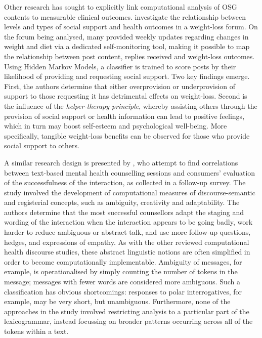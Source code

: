 Other research has sought to explicitly link computational analysis of \gls{OSG} contents to measurable clinical outcomes. \textcite{yan2015good} investigate the relationship between levels and types of social support and health outcomes in a weight\hyp{}loss \gls{forum}. On the \gls{forum} being analysed, many  provided weekly updates regarding changes in weight and diet via a dedicated self\hyp{}monitoring tool, making it possible to map the relationship between \gls{post} content, replies received and weight\hyp{}loss outcomes. Using Hidden Markov Models, a classifier is trained to score \glspl{post} by their likelihood of providing and requesting social support. Two key findings emerge. First, the authors determine that either overprovision or underprovision of support to those requesting it has detrimental effects on weight\hyp{}loss. Second is the influence of the \emph{helper\hyp{}therapy principle}, whereby assisting others through the provision of social support or health information can lead to positive feelings, which in turn may boost self\hyp{}esteem and psychological well\hyp{}being. More specifically, tangible weight\hyp{}loss benefits can be observed for those who provide social support to others.

A similar research design is presented by \textcite{althoff_counseling_2016}, who attempt to find correlations between text\hyp{}based mental health counselling sessions and consumers' evaluation of the successfulness of the interaction, as collected in a follow\hyp{}up survey. The study involved the development of computational measures of discourse-semantic and registerial concepts, such as ambiguity, creativity and adaptability. The authors determine that the most successful counsellors adapt the staging and wording of the interaction when the interaction appears to be going badly, work harder to reduce ambiguous or abstract talk, and use more follow-up questions, hedges, and expressions of empathy. As with the other reviewed computational health discourse studies, these abstract linguistic notions are often simplified in order to become computationally implementable. Ambiguity of messages, for example, is operationalised by simply counting the number of tokens in the message; messages with fewer words are considered more ambiguous. Such a classification has obvious shortcomings: responses to polar interrogatives, for example, may be very short, but unambiguous. Furthermore, none of the approaches in the study involved restricting analysis to a particular part of the lexicogrammar, instead focussing on broader patterns occurring across all of the tokens within a text.

